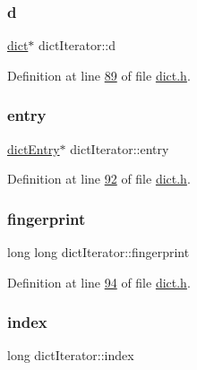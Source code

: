 \subsubsection{\texorpdfstring{d}{d}}
{\footnotesize\ttfamily \hyperlink{structdict}{dict}$\ast$ dict\+Iterator\+::d}



Definition at line \hyperlink{dict_8h_source_l00089}{89} of file \hyperlink{dict_8h_source}{dict.\+h}.

\mbox{\label{structdictIterator_a5bbcc9b0c792e1ee68c6a4ed049da816}} 
\subsubsection{\texorpdfstring{entry}{entry}}
{\footnotesize\ttfamily \hyperlink{structdictEntry}{dict\+Entry}$\ast$ dict\+Iterator\+::entry}



Definition at line \hyperlink{dict_8h_source_l00092}{92} of file \hyperlink{dict_8h_source}{dict.\+h}.

\mbox{\label{structdictIterator_a88066bf1d96483011eaf2cf73ee4f0a0}} 
\subsubsection{\texorpdfstring{fingerprint}{fingerprint}}
{\footnotesize\ttfamily long long dict\+Iterator\+::fingerprint}



Definition at line \hyperlink{dict_8h_source_l00094}{94} of file \hyperlink{dict_8h_source}{dict.\+h}.

\mbox{\label{structdictIterator_a3e0798e8d5e0906fbd6181a2588b3e98}} 
\subsubsection{\texorpdfstring{index}{index}}
{\footnotesize\ttfamily long dict\+Iterator\+::index}



